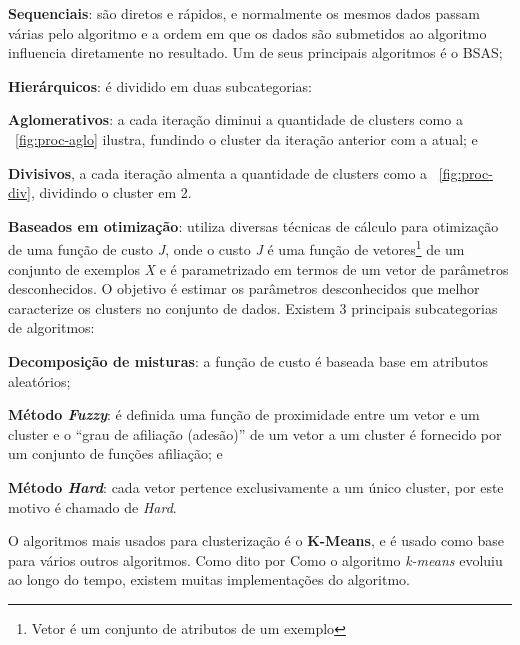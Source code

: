 \begin{alineas}
	\item \textbf{Sequenciais}: são diretos e rápidos, e normalmente os mesmos dados passam várias pelo algoritmo e a ordem em que os 
	dados são submetidos ao algoritmo influencia diretamente no resultado. Um de seus principais algoritmos é o BSAS;  
	
	\item \textbf{Hierárquicos}:  é dividido em duas subcategorias:
		\begin{alineas}
			\item \textbf{Aglomerativos}: a cada iteração diminui a quantidade de clusters como a ~\autoref{fig:proc-aglo} ilustra, fundindo o cluster da iteração anterior com a atual; e 
			\item \textbf{Divisivos}, a cada iteração almenta a quantidade de clusters como a ~\autoref{fig:proc-div}, dividindo o cluster em 2. 
		\end{alineas} 	
	\item \textbf{Baseados em otimização}: utiliza diversas técnicas de cálculo para otimização de uma função de custo \textit{J}, 
	onde o custo \textit{J} é uma função de vetores\footnote{Vetor é um conjunto de atributos de um exemplo} de um conjunto de exemplos \textit{X} e é parametrizado em termos de um 
	vetor de parâmetros desconhecidos. O objetivo é estimar os parâmetros desconhecidos que melhor caracterize os clusters no
	conjunto de dados. Existem 3 principais subcategorias de algoritmos:  
	\begin{alineas}
		\item \textbf{Decomposição de misturas}: a função de custo é baseada base em atributos aleatórios;
		
		\item \textbf{Método \textit{Fuzzy}}: é definida uma função de proximidade entre um vetor e um cluster e o
		 “grau de afiliação (adesão)” de um vetor a um cluster é fornecido por um conjunto de funções afiliação; e	
		
		\item \textbf{Método \textit{Hard}}: cada vetor pertence exclusivamente a um único cluster, por este motivo é chamado de \textit{Hard}.		 	
	\end{alineas} 		
\end{alineas}   

O algoritmos mais usados para clusterização é o \textbf{K-Means}, e é usado como base para vários outros algoritmos.
Como dito por \cite{k-means}Como o algoritmo \textit{k-means} evoluiu ao longo do tempo, existem muitas implementações do algoritmo.
 
